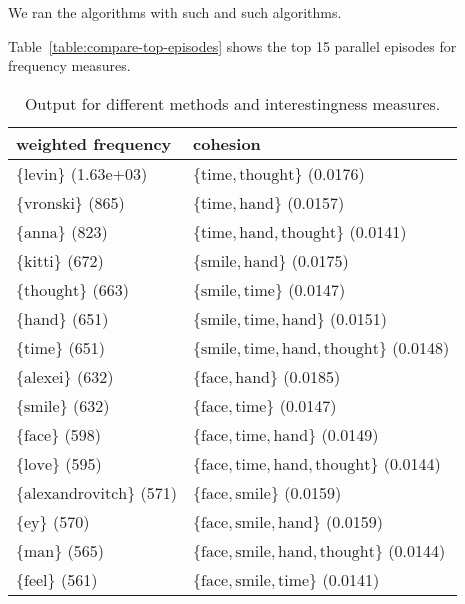 We ran the algorithms with such and such algorithms.

Table~\ref{table:compare-top-episodes} shows the top 15 parallel episodes for frequency measures.

\begin{table}

\begin{tabulary}{\textwidth}{L|L}

weighted frequency & cohesion \\
\hline
$ \{ \text{levin} \} $ (1.63e+03) & $ \{ \text{time}, \text{thought} \} $ (0.0176) \\
$ \{ \text{vronski} \} $ (865) & $ \{ \text{time}, \text{hand} \} $ (0.0157) \\
$ \{ \text{anna} \} $ (823) & $ \{ \text{time}, \text{hand}, \text{thought} \} $ (0.0141) \\
$ \{ \text{kitti} \} $ (672) & $ \{ \text{smile}, \text{hand} \} $ (0.0175) \\
$ \{ \text{thought} \} $ (663) & $ \{ \text{smile}, \text{time} \} $ (0.0147) \\
$ \{ \text{hand} \} $ (651) & $ \{ \text{smile}, \text{time}, \text{hand} \} $ (0.0151) \\
$ \{ \text{time} \} $ (651) & $ \{ \text{smile}, \text{time}, \text{hand}, \text{thought} \} $ (0.0148) \\
$ \{ \text{alexei} \} $ (632) & $ \{ \text{face}, \text{hand} \} $ (0.0185) \\
$ \{ \text{smile} \} $ (632) & $ \{ \text{face}, \text{time} \} $ (0.0147) \\
$ \{ \text{face} \} $ (598) & $ \{ \text{face}, \text{time}, \text{hand} \} $ (0.0149) \\
$ \{ \text{love} \} $ (595) & $ \{ \text{face}, \text{time}, \text{hand}, \text{thought} \} $ (0.0144) \\
$ \{ \text{alexandrovitch} \} $ (571) & $ \{ \text{face}, \text{smile} \} $ (0.0159) \\
$ \{ \text{ey} \} $ (570) & $ \{ \text{face}, \text{smile}, \text{hand} \} $ (0.0159) \\
$ \{ \text{man} \} $ (565) & $ \{ \text{face}, \text{smile}, \text{hand}, \text{thought} \} $ (0.0144) \\
$ \{ \text{feel} \} $ (561) & $ \{ \text{face}, \text{smile}, \text{time} \} $ (0.0141) \\
\end{tabulary}

\caption{Output for different methods and interestingness measures.}
\end{table}
